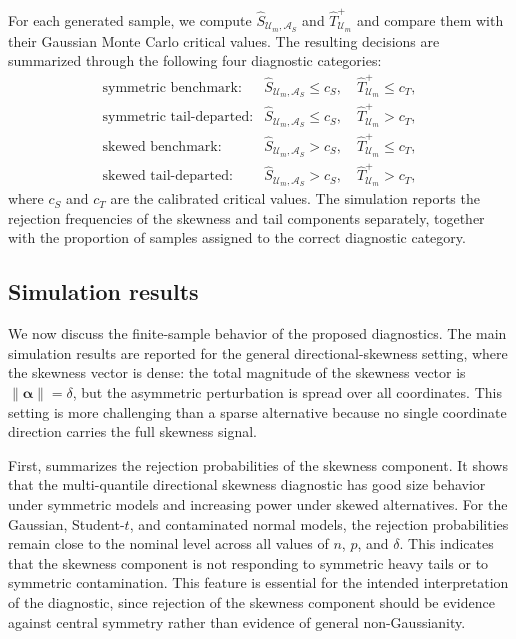 \documentclass[11pt]{article}
\theoremstyle{plain}
\theoremstyle{definition}
\theoremstyle{remark}
\newcommand{\boldalpha}{\bm{\alpha}}
\newcommand{\norm}[1]{\left\| #1 \right\|}
\begin{document}
For each generated sample, we compute $\widehat S_{\mathcal U_m,\mathcal A_S}$ and $\widehat T_{\mathcal U_m}^{+}$ and compare them with their Gaussian Monte Carlo critical values.  The resulting decisions are summarized through the following four diagnostic categories:
\begin{equation*}
\begin{array}{ll}
\text{symmetric benchmark:} & \widehat S_{\mathcal U_m,\mathcal A_S}\leqslant c_S,\quad \widehat T_{\mathcal U_m}^{+}\leqslant c_T,\\
\text{symmetric tail-departed:} & \widehat S_{\mathcal U_m,\mathcal A_S}\leqslant c_S,\quad \widehat T_{\mathcal U_m}^{+}> c_T,\\
\text{skewed benchmark:} & \widehat S_{\mathcal U_m,\mathcal A_S}> c_S,\quad \widehat T_{\mathcal U_m}^{+}\leqslant c_T,\\
\text{skewed tail-departed:} & \widehat S_{\mathcal U_m,\mathcal A_S}> c_S,\quad \widehat T_{\mathcal U_m}^{+}> c_T,
\end{array}
\end{equation*}
where $c_S$ and $c_T$ are the calibrated critical values.  The simulation reports the rejection frequencies of the skewness and tail components separately, together with the proportion of samples assigned to the correct diagnostic category.


\subsection{Simulation results}\label{sec:simulation_results}

We now discuss the finite-sample behavior of the proposed diagnostics.  The main simulation results are reported for the general directional-skewness setting, where the skewness vector is dense: the total magnitude of the skewness vector is $\norm{\boldalpha}=\delta$, but the asymmetric perturbation is spread over all coordinates.  This setting is more challenging than a sparse alternative because no single coordinate direction carries the full skewness signal.  

First,  summarizes the rejection probabilities of the skewness component. It shows that the multi-quantile directional skewness diagnostic has good size behavior under symmetric models and increasing power under skewed alternatives.  For the Gaussian, Student-$t$, and contaminated normal models, the rejection probabilities remain close to the nominal level across all values of $n$, $p$, and $\delta$.  This indicates that the skewness component is not responding to symmetric heavy tails or to symmetric contamination.  This feature is essential for the intended interpretation of the diagnostic, since rejection of the skewness component should be evidence against central symmetry rather than evidence of general non-Gaussianity.
\end{document}
